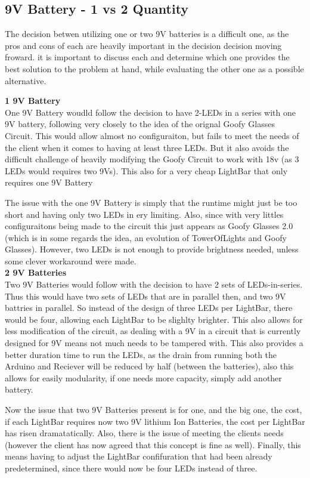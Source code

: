 \documentclass[12pt]{article}
\begin{document}
{{{{{{{	\subsection{9V Battery - 1 vs 2 Quantity}
	The decision betwen utilizing one or two 9V batteries is a difficult one, as the pros and cons of each are heavily important in the decision decision moving froward. it is important to discuss each and determine which one provides the best solution to the problem at hand, while evaluating the other one as a possible alternative.
	
		\noindent\textbf{1 9V Battery}\\
			\indent One 9V Battery woudld follow the decision to have 2-LEDs in a series with one 9V battery, following very closely to the idea of the orignal Goofy Glasses Circuit. This would allow almost no configuraiton, but fails to meet the needs of the client when it comes to having at least three LEDs. But it also avoids the difficult challenge of heavily modifying the Goofy Circuit to work with 18v (as 3 LEDs would requires two 9Vs). This also for a very cheap LightBar that only requires one 9V Battery
			
			\indent The issue with the one 9V Battery is simply that the runtime might just be too short and having only two LEDs in ery limiting. Also, since with very littles configuraitons being made to the circuit this just appears as Goofy Glasses 2.0 (which is in some regards the idea, an evolution of TowerOfLights and Goofy Glasses). However, two LEDs is not enough to provide brightness needed, unless some clever workaround were made.\\
		
		
		\noindent\textbf{2 9V Batteries}\\
			\indent Two 9V Batteries would follow with the decision to have 2 sets of LEDs-in-series. Thus this would have two sets of LEDs that are in parallel then, and two 9V battries in parallel. So instead of the design of three LEDs per LightBar, there would be four, allowing each LightBar to be slighlty brighter. This also allows for less modification of the circuit, as dealing with a 9V in a circuit that is currently designed for 9V means not much needs to be tampered with. This also provides a better duration time to run the LEDs, as the drain from running both the Arduino and Reciever will be reduced by half (between the batteries), also this allows for easily modularity, if one needs more capacity, simply add another battery.
			
			\indent Now the issue that two 9V Batteries present is for one, and the big one, the cost, if each LightBar requires now two 9V lithium Ion Batteries, the cost per LightBar has risen dramatatically. Also, there is the issue of meeting the clients needs (however the client has now agreed that this concept is fine as well). Finally, this means having to adjust the LightBar confifuration that had been already predetermined, since there would now be four LEDs instead of three.\\
		
}}}}}}}
\end{document}
